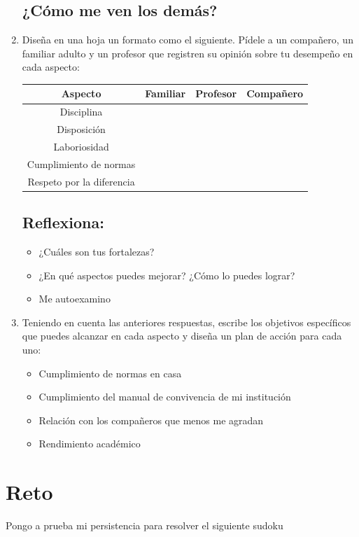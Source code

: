 \documentclass[10pt,twoside]{article}
\begin{document}
\begin{enumerate}
\subsection*{¿C\'{o}mo me ven los dem\'{a}s?}
\item Diseña en una hoja un formato como el siguiente. Pídele a un compañero, un familiar adulto y un profesor que registren su opinión sobre tu desempeño en cada aspecto:
\begin{center}
\begin{tabular}{|c|c|c|c|}
\hline 
\textbf{Aspecto} & \textbf{Familiar} & \textbf{Profesor} & \textbf{Compañero} \\ 
\hline 
Disciplina &  &  &  \\ 
\hline 
Disposición &  &  &  \\ 
\hline 
Laboriosidad &  &  &  \\ 
\hline 
Cumplimiento de normas &  &  &  \\ 
\hline 
Respeto por la diferencia &  &  &  \\ 
\hline 
\end{tabular} 
\end{center}
\subsection*{Reflexiona:}
\begin{itemize}
\item ¿Cuáles son tus fortalezas?
\item ¿En qué aspectos puedes mejorar? ¿Cómo lo puedes lograr?
\item Me autoexamino
\end{itemize}
\item Teniendo en cuenta las anteriores respuestas, escribe los objetivos específicos que puedes alcanzar en cada aspecto y diseña un plan de acción para cada uno:
\begin{itemize}
\item Cumplimiento de normas en casa
\item Cumplimiento del manual de convivencia de mi institución
\item Relación con los compañeros que menos me agradan
\item Rendimiento académico
\end{itemize}
\end{enumerate}
\section*{Reto}
Pongo a prueba mi persistencia para resolver el siguiente sudoku

\end{document}
